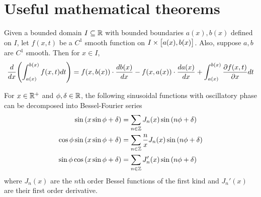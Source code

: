 \section{Useful mathematical theorems}

\begin{theorem}\label{thm:leibniz_rule}
    Given a bounded domain $I\subseteq\mathbb{R}$ with bounded boundaries $a(x),b(x)$
    defined on $I$, let $f(x,t)$ be a $C^1$ smooth function on
    $I\times\qty[a(x),b(x)]$. Also, suppose $a,b$ are $C^1$ smooth. Then for
    $x\in I$,
    \begin{equation}
        \frac{d}{dx}\qty(\int_{a(x)}^{b(x)}f(x,t)dt)=f(x,b(x))\cdot
        \frac{db(x)}{dx}-f(x,a(x))\cdot\frac{da(x)}{dx}+\int_{a(x)}^{b(x)}\frac{\partial
        f(x,t)}{\partial x}dt
    \end{equation}
\end{theorem}

\begin{theorem}\label{thm:bessel_decomposition}
    For $x\in\mathbb{R}^+$ and $\phi,\delta\in\mathbb{R}$, the following sinusoidal functions
    with oscillatory phase can be decomposed into Bessel-Fourier series
    \begin{subequations}
        \begin{align}
        \sin\qty(x\sin\phi+\delta)&=\sum_{n\in\mathbb{Z}}J_n(x)\sin\qty(n\phi+\delta)\\
    \cos\phi
        \sin\qty(x\sin\phi+\delta)&=\sum_{n\in\mathbb{Z}}\frac{n}{x}J_n(x)\sin\qty(n\phi+\delta)\\
        \sin\phi\cos\qty(x\sin\phi+\delta)&=\sum_{n\in\mathbb{Z}}J_n'(x)\sin\qty(n\phi+\delta)
        \end{align}
    \end{subequations}
    where $J_n(x)$ are the $n$th order Bessel functions of the first kind and
    $J_n'(x)$ are their first order derivative.
\end{theorem}
